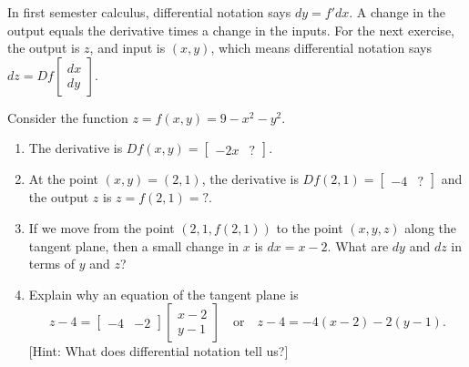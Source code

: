 In first semester calculus, differential notation says $dy=f' dx$. A change in the output equals the derivative times a change in the inputs.  For the next exercise, the output is $z$, and input is $(x,y)$, which means differential notation says $dz = Df \begin{bmatrix}dx\\dy\end{bmatrix}$.  

\begin{problem}\label{prob:tangent plane downbowl}%
		
 
Consider the function $z=f(x,y)=9-x^2-y^2$. 
\begin{enumerate}
	\item The derivative is $Df(x,y) = \begin{bmatrix}-2x&?\end{bmatrix}$. 
	\item At the point $(x,y)=(2,1)$, the derivative is $Df(2,1) = \begin{bmatrix}-4&?\end{bmatrix}$ and the output $z$ is $z=f(2,1)=?$.
	\item If we move from the point $(2,1,f(2,1))$ to the point $(x,y,z)$ along the tangent plane, then a small change in $x$ is $dx=x-2$. What are $dy$ and $dz$ in terms of $y$ and $z$?
	\item Explain why an equation of the tangent plane is 
$$
z-4=\begin{bmatrix}-4 & -2 \end{bmatrix}\begin{bmatrix}x-2\\y-1\end{bmatrix} 
\quad \text{or}\quad 
z-4=-4(x-2)-2(y-1).$$ [Hint: What does differential notation tell us?]
\end{enumerate}
\end{problem}

